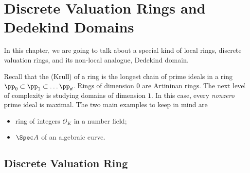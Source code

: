 \chapter{Discrete Valuation Rings and Dedekind Domains}
\label{chap:dvr}
In this chapter, we are going to talk about
a special kind of local rings, discrete valuation rings,
and its non-local analogue, Dedekind domain.

Recall that the (Krull)
 of a ring is the longest chain
of prime ideals in a ring $\pp_0\subset\pp_1\subset\dots\pp_d$.
Rings of dimension $0$ are Artininan rings.
The next level of complexity is studying domains of dimension $1$.
In this case, every \textit{nonzero} prime ideal is maximal.
The two main examples to keep in mind are
\begin{itemize}
    \item ring of integers $\mathcal O_K$ in a number field;
    \item $\Spec A$ of an algebraic curve.
\end{itemize}

\section{Discrete Valuation Ring}

